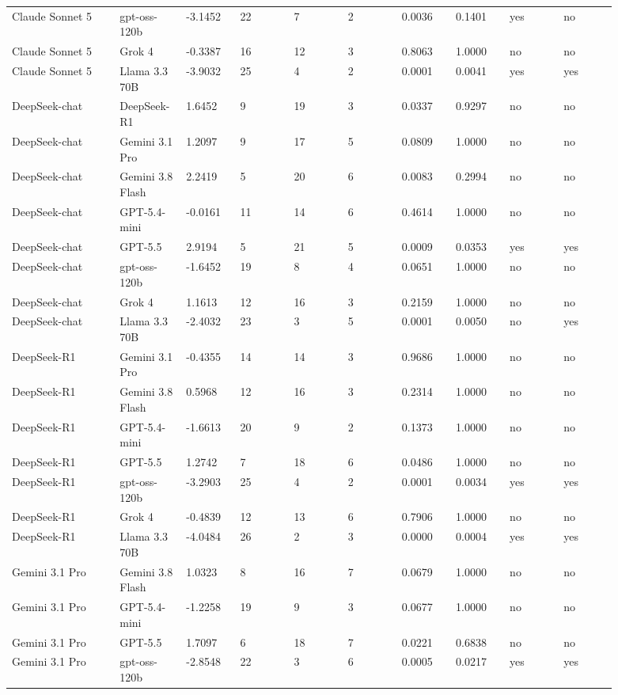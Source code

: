 \begin{landscape}
\begin{longtable}{p{0.162\linewidth}p{0.081\linewidth}p{0.081\linewidth}p{0.081\linewidth}p{0.081\linewidth}p{0.081\linewidth}p{0.081\linewidth}p{0.081\linewidth}p{0.081\linewidth}p{0.081\linewidth}}
Claude Sonnet 5 & gpt-oss-120b & -3.1452 & 22 & 7 & 2 & 0.0036 & 0.1401 & yes & no \\
Claude Sonnet 5 & Grok 4 & -0.3387 & 16 & 12 & 3 & 0.8063 & 1.0000 & no & no \\
Claude Sonnet 5 & Llama 3.3 70B & -3.9032 & 25 & 4 & 2 & 0.0001 & 0.0041 & yes & yes \\
DeepSeek-chat & DeepSeek-R1 & 1.6452 & 9 & 19 & 3 & 0.0337 & 0.9297 & no & no \\
DeepSeek-chat & Gemini 3.1 Pro & 1.2097 & 9 & 17 & 5 & 0.0809 & 1.0000 & no & no \\
DeepSeek-chat & Gemini 3.8 Flash & 2.2419 & 5 & 20 & 6 & 0.0083 & 0.2994 & no & no \\
DeepSeek-chat & GPT-5.4-mini & -0.0161 & 11 & 14 & 6 & 0.4614 & 1.0000 & no & no \\
DeepSeek-chat & GPT-5.5 & 2.9194 & 5 & 21 & 5 & 0.0009 & 0.0353 & yes & yes \\
DeepSeek-chat & gpt-oss-120b & -1.6452 & 19 & 8 & 4 & 0.0651 & 1.0000 & no & no \\
DeepSeek-chat & Grok 4 & 1.1613 & 12 & 16 & 3 & 0.2159 & 1.0000 & no & no \\
DeepSeek-chat & Llama 3.3 70B & -2.4032 & 23 & 3 & 5 & 0.0001 & 0.0050 & no & yes \\
DeepSeek-R1 & Gemini 3.1 Pro & -0.4355 & 14 & 14 & 3 & 0.9686 & 1.0000 & no & no \\
DeepSeek-R1 & Gemini 3.8 Flash & 0.5968 & 12 & 16 & 3 & 0.2314 & 1.0000 & no & no \\
DeepSeek-R1 & GPT-5.4-mini & -1.6613 & 20 & 9 & 2 & 0.1373 & 1.0000 & no & no \\
DeepSeek-R1 & GPT-5.5 & 1.2742 & 7 & 18 & 6 & 0.0486 & 1.0000 & no & no \\
DeepSeek-R1 & gpt-oss-120b & -3.2903 & 25 & 4 & 2 & 0.0001 & 0.0034 & yes & yes \\
DeepSeek-R1 & Grok 4 & -0.4839 & 12 & 13 & 6 & 0.7906 & 1.0000 & no & no \\
DeepSeek-R1 & Llama 3.3 70B & -4.0484 & 26 & 2 & 3 & 0.0000 & 0.0004 & yes & yes \\
Gemini 3.1 Pro & Gemini 3.8 Flash & 1.0323 & 8 & 16 & 7 & 0.0679 & 1.0000 & no & no \\
Gemini 3.1 Pro & GPT-5.4-mini & -1.2258 & 19 & 9 & 3 & 0.0677 & 1.0000 & no & no \\
Gemini 3.1 Pro & GPT-5.5 & 1.7097 & 6 & 18 & 7 & 0.0221 & 0.6838 & no & no \\
Gemini 3.1 Pro & gpt-oss-120b & -2.8548 & 22 & 3 & 6 & 0.0005 & 0.0217 & yes & yes \\

\end{longtable}
\end{landscape}
